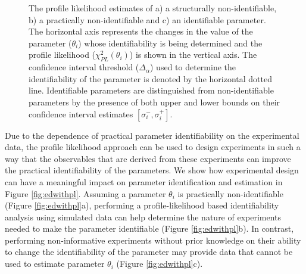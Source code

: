 \documentclass[10pt]{article}
\begin{document}
	\begin{figure}[!tbhp]
		\caption{The profile likelihood estimates of a) a structurally non-identifiable, b) a practically non-identifiable and c) an identifiable parameter. The horizontal axis represents the changes in the value of the parameter ($\theta_i$) whose identifiability is being determined and the profile likelihood ($\chi^2_{PL}(\theta_i)$) is shown in the vertical axis. The confidence interval threshold ($\Delta_{\alpha}$) used to determine the identifiability of the parameter is denoted by the horizontal dotted line. Identifiable parameters are distinguished from non-identifiable parameters by the presence of both upper and lower bounds on their confidence interval estimates $\left[\sigma_{i}^-,\sigma_{i}^+\right]$. }\label{fig:identtypes}
	\end{figure}	
	
	Due to the dependence of practical parameter identifiability on the experimental data, the profile likelihood approach can be used to design experiments in such a way that the observables that are derived from these experiments can improve the practical identifiability of the parameters. We show how experimental design can have a meaningful impact on parameter identification and estimation in Figure \ref{fig:edwithpl}.	Assuming a parameter $\theta_i$ is practically non-identifiable (Figure \ref{fig:edwithpl}a), performing a profile-likelihood based identifiability analysis using simulated data can help determine the nature of experiments needed to make the parameter identifiable (Figure \ref{fig:edwithpl}b). In contrast, performing non-informative experiments without prior knowledge on their ability to change the identifiability of the parameter may provide data that cannot be used to estimate parameter $\theta_i$ (Figure \ref{fig:edwithpl}c).	
	
\end{document}

